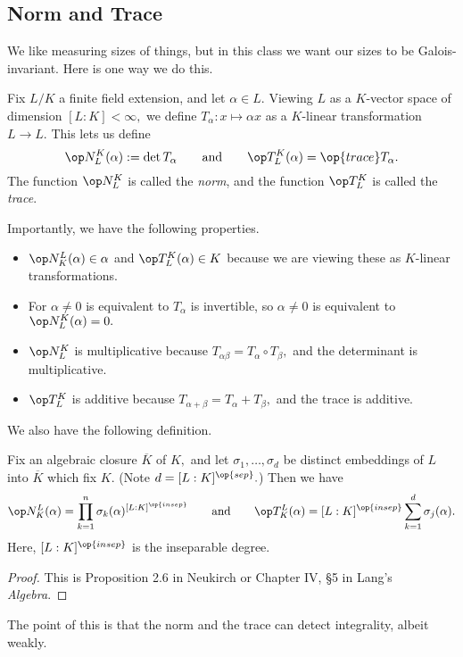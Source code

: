 \documentclass[../notes.tex]{subfiles}
\begin{document}
\subsection{Norm and Trace}
We like measuring sizes of things, but in this class we want our sizes to be Galois-invariant. Here is one way we do this.
\begin{defi}
    Fix $L/K$ a finite field extension, and let $\alpha\in L.$ Viewing $L$ as a $K$-vector space of dimension $[L:K]<\infty,$ we define $T_\alpha:x\mapsto\alpha x$ as a $K$-linear transformation $L\to L.$ This lets us define
    \[\op N^K_L(\alpha):=\det T_\alpha\qquad\text{and}\qquad\op T^K_L(\alpha)=\op{trace}T_\alpha.\]
    The function $\op N^K_L$ is called the \textit{norm}, and the function $\op T^K_L$ is called the \textit{trace}.
\end{defi}
\begin{remark}
    Importantly, we have the following properties.
    \begin{itemize}
        \item $\op N_K^L(\alpha)\in \alpha$ and $\op T^K_L(\alpha)\in K$ because we are viewing these as $K$-linear transformations.
        \item For $\alpha\ne0$ is equivalent to $T_\alpha$ is invertible, so $\alpha\ne0$ is equivalent to $\op N^K_L(\alpha)=0.$
        \item $\op N_L^K$ is multiplicative because $T_{\alpha\beta}=T_\alpha\circ T_\beta,$ and the determinant is multiplicative.
        \item $\op T_L^K$ is additive because $T_{\alpha+\beta}=T_\alpha+T_\beta,$ and the trace is additive.
    \end{itemize}
\end{remark}
We also have the following definition.
\begin{prop}
    Fix an algebraic closure $\overline K$ of $K,$ and let $\sigma_1,\ldots,\sigma_d$ be distinct embeddings of $L$ into $\overline K$ which fix $K.$ (Note $d=[L:K]^{\op{sep}}.$) Then we have
    \[\op N_K^L(\alpha)=\prod_{k=1}^n\sigma_k(\alpha)^{[L:K]^{\op{insep}}}\qquad\text{and}\qquad\op T_K^L(\alpha)=[L:K]^{\op{insep}}\sum_{k=1}^d\sigma_j(\alpha).\]
    Here, $[L:K]^{\op{insep}}$ is the inseparable degree.
\end{prop}
\begin{proof}
    This is Proposition 2.6 in Neukirch or Chapter IV, \S5 in Lang's \textit{Algebra}.
\end{proof}
The point of this is that the norm and the trace can detect integrality, albeit weakly.
\end{document}
